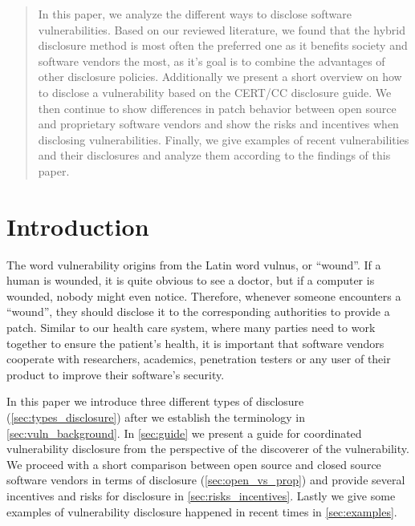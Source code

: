 \begin{abstract}
In this paper, we analyze the different ways to disclose software vulnerabilities. Based on our reviewed literature, we found that the hybrid disclosure method is most often the preferred one as it benefits society and software vendors the most, as it's goal is to combine the advantages of other disclosure policies. Additionally we present a short overview on how to disclose a vulnerability based on the CERT/CC disclosure guide. We then continue to show differences in patch behavior between open source and proprietary software vendors and show the risks and incentives when disclosing vulnerabilities. Finally, we give examples of recent vulnerabilities and their disclosures and analyze them according to the findings of this paper.
\end{abstract}

\section{Introduction}

The word vulnerability origins from the Latin word vulnus, or ``wound''. If a human is wounded, it is quite obvious to see a doctor, but if a computer is wounded, nobody might even notice. Therefore, whenever someone encounters a ``wound'', they should disclose it to the corresponding authorities to provide a patch. Similar to our health care system, where many parties need to work together to ensure the patient's health, it is important that software vendors cooperate with researchers, academics, penetration testers or any user of their product to improve their software's security.


In this paper we introduce three different types of disclosure (\autoref{sec:types_disclosure}) after we establish the terminology in \autoref{sec:vuln_background}. In \autoref{sec:guide} we present a guide for coordinated vulnerability disclosure from the perspective of the discoverer of the vulnerability. We proceed with a short comparison between open source and closed source software vendors in terms of disclosure (\autoref{sec:open_vs_prop}) and provide several incentives and risks for disclosure in \autoref{sec:risks_incentives}. Lastly we give some examples of vulnerability disclosure happened in recent times in \autoref{sec:examples}.


